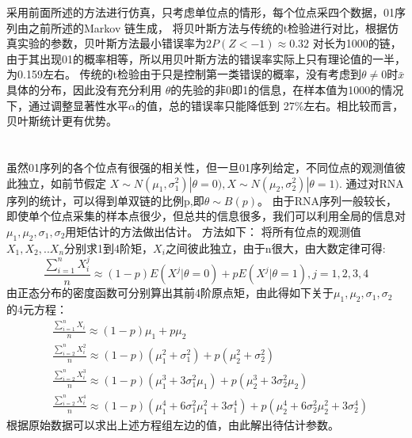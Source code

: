 \documentclass[12pt]{article}
\begin{document}
\title{\textbf{}} 

\author{}
\maketitle
\large
\section{\textbf{}}
采用前面所述的方法进行仿真，只考虑单位点的情形，每个位点采四个数据，01序列由之前所述的Markov 链生成，
将贝叶斯方法与传统的t检验进行对比，根据仿真实验的参数，贝叶斯方法最小错误率为$2P(Z<-1)\approx 0.32$
对长为1000的链，由于其出现01的概率相等，所以用贝叶斯方法的错误率实际上只有理论值的一半，为0.159左右。
传统的t检验由于只是控制第一类错误的概率，没有考虑到$\theta \ne 0$时$\bar{x}$具体的分布，因此没有充分利用
$\theta$的先验的非0即1的信息，在样本值为1000的情况下，通过调整显著性水平$\alpha$的值，总的错误率只能降低到
27\%左右。相比较而言，贝叶斯统计更有优势。
\section{\textbf{}}
虽然01序列的各个位点有很强的相关性，但一旦01序列给定，不同位点的观测值彼此独立，如前节假定
$X \sim N(\mu_1,\sigma_1^2) | \theta=0),X \sim N(\mu_2,\sigma_2^2) | \theta=1)$.
通过对RNA序列的统计，可以得到单双链的比例p,即$\theta \sim B(p)$。
由于RNA序列一般较长，即使单个位点采集的样本点很少，但总共的信息很多，我们可以利用全局的信息对
$\mu_1,\mu_2,\sigma_1,\sigma_2$用矩估计的方法做出估计。
方法如下：
将所有位点的观测值$X_1,X_2,..X_n$分别求1到4阶矩，$X_i$之间彼此独立，由于n很大，由大数定律可得:
\begin{equation}
\frac{\sum_{i=1}^n X^j_i}{n} \approx (1-p)E(X^j|\theta=0)+pE(X^j|\theta=1),j=1,2,3,4
\end{equation}
由正态分布的密度函数可分别算出其前4阶原点矩，由此得如下关于$\mu_1,\mu_2,\sigma_1,\sigma_2$
的4元方程：
\begin{equation}
\begin{split}
&\frac{\sum_{i=1}^n X_i}{n} \approx (1-p)\mu_1+p\mu_2 \\
&\frac{\sum_{i=2}^n X^2_i}{n} \approx (1-p)(\mu_1^2+\sigma_1^2)+p(\mu_2^2+\sigma_2^2) \\
&\frac{\sum_{i=2}^n X^3_i}{n} \approx (1-p)(\mu_1^3+3\sigma_1^2\mu_1)+p(\mu_2^3+3\sigma_2^2\mu_2) \\
&\frac{\sum_{i=2}^n X^4_i}{n} \approx (1-p)(\mu_1^4+6\sigma_1^2\mu_1^2+3\sigma_1^4)+p(\mu_2^4+6\sigma_2^2\mu_2^2+3\sigma_2^4)
\end{split}
\end{equation}
根据原始数据可以求出上述方程组左边的值，由此解出待估计参数。
\end{document}
